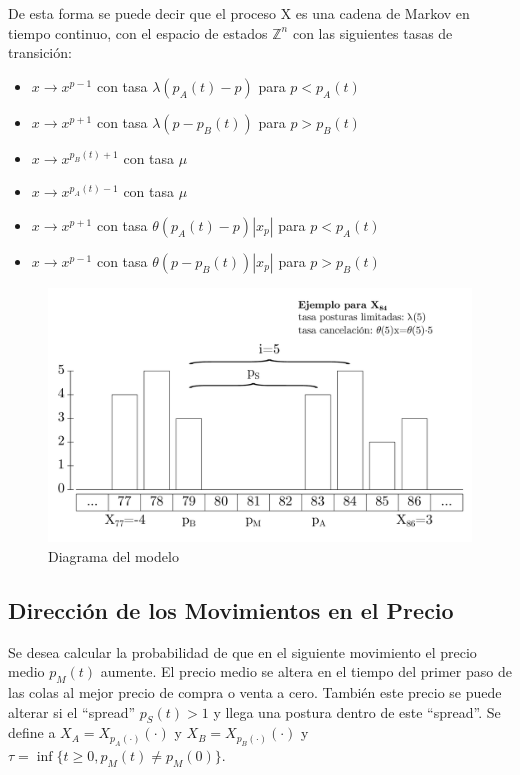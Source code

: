 \documentclass[11pt]{article}
\numberwithin{equation}{section} %
\begin{document}
De esta forma se puede decir que el proceso X es una cadena de Markov en tiempo continuo, con el espacio de estados $\mathbb{Z}^n$ con las siguientes tasas de transición:
\begin{itemize}
\item $x\rightarrow x^{p-1}$ con tasa $\lambda(p_A(t)-p)$ para $p<p_A(t)$
\item $x\rightarrow x^{p+1}$ con tasa $\lambda(p-p_B(t))$ para $p>p_B(t)$
\item $x\rightarrow x^{p_B(t)+1}$ con tasa $\mu$
\item $x\rightarrow x^{p_A(t)-1}$ con tasa $\mu$
\item $x\rightarrow x^{p+1}$ con tasa $\theta(p_A(t)-p)|x_p|$ para $p<p_A(t)$
\item $x\rightarrow x^{p-1}$ con tasa $\theta(p-p_B(t))|x_p|$ para $p>p_B(t)$
\end{itemize}

\begin{figure}[htbp] \centering
\includegraphics[scale=0.38,trim=0 1cm 0 1cm]{model.pdf}
\caption{Diagrama del modelo}
\label{model}
\end{figure}

\subsection{Dirección de los Movimientos en el Precio}

Se desea calcular la probabilidad de que en el siguiente movimiento el precio medio $p_M(t)$ aumente. El precio medio se altera en el tiempo del primer paso de las colas al mejor precio de compra o venta a cero. También este precio se puede alterar si el ``spread'' $p_S(t)>1$ y llega una postura dentro de este ``spread''. Se define a $X_A=X_{p_A(\cdot)}(\cdot)$ y $X_B=X_{p_B(\cdot)}(\cdot)$ y $\tau=\inf\{t\geq 0, p_M(t) \neq p_M(0)\}$.\\
\end{document}
